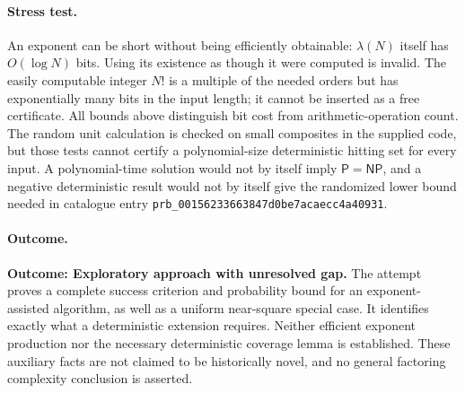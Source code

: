 \documentclass[11pt,a4paper]{article}
\begin{document}
\paragraph{Stress test.}
An exponent can be short without being efficiently obtainable:
$\lambda(N)$ itself has $O(\log N)$ bits. Using its existence as though
it were computed is invalid. The easily computable integer $N!$ is a
multiple of the needed orders but has exponentially many bits in the
input length; it cannot be inserted as a free certificate. All bounds
above distinguish bit cost from arithmetic-operation count. The random
unit calculation is checked on small composites in the supplied code,
but those tests cannot certify a polynomial-size deterministic hitting
set for every input. A polynomial-time solution would not by itself imply
$\mathsf P=\mathsf{NP}$, and a negative deterministic result would not
by itself give the randomized lower bound needed in catalogue entry \texttt{prb\_00156233663847d0be7acaecc4a40931}.

\paragraph{Outcome.}
\textbf{Outcome: Exploratory approach with unresolved gap.}
The attempt proves a complete success criterion and probability bound for
an exponent-assisted algorithm, as well as a uniform near-square special
case. It identifies exactly what a deterministic extension requires.
Neither efficient exponent production nor the necessary deterministic
coverage lemma is established. These auxiliary facts are not claimed to
be historically novel, and no general factoring complexity conclusion is
asserted.
\end{document}
